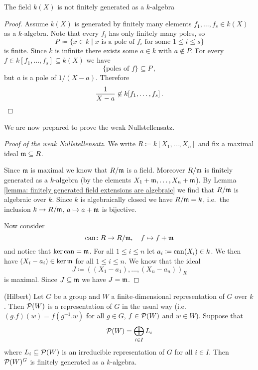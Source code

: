 \begin{rem}
  The field $k(X)$ is not finitely generated as a $k$-algebra
  \begin{proof}
    Assume $k(X)$ is generated by finitely many elements $f_1, \dotsc, f_s \in k(X)$ as a $k$-algebra. Note that every $f_i$ has only finitely many poles, so
    \[
      P \coloneqq \{x \in k \mid \text{$x$ is a pole of $f_i$ for some $1 \leq i \leq s$}\}
    \]
    is finite. Since $k$ is infinite there exists some $a \in k$ with $a \not\in P$. For every $f \in k[f_1, \dotsc, f_s] \subseteq k(X)$ we have
    \[
      \{\text{poles of $f$}\} \subseteq P \,,
    \]
      but $a$ is a pole of $1/(X-a)$. Therefore
    \[
      \frac{1}{X-a} \not\in k[f_1, \dotsc, f_s] \,.
      \qedhere
    \]
  \end{proof}
\end{rem}


We are now prepared to prove the weak Nullstellensatz.


\begin{proof}[Proof of the weak Nullstellensatz]
  We write $R \coloneqq k[X_1, \dotsc, X_n]$ and fix a maximal ideal $\mathfrak{m} \subseteq R$.
  
  Since $\mathfrak{m}$ is maximal we know that $R / \mathfrak{m}$ is a field.
  Moreover $R / \mathfrak{m}$ is finitely generated as a $k$-algebra (by the elements $X_1 + \mathfrak{m}, \dotsc, X_n + \mathfrak{m}$).
  By Lemma \ref{lemma: finitely generated field extensions are algebraic} we find that $R/\mathfrak{m}$ is algebraic over $k$.
  Since $k$ is algebraically closed we have $R / \mathfrak{m} = k$, i.e.\ the inclusion $k \to R / \mathfrak{m}$, $a \mapsto a + \mathfrak{m}$ is bijective.
  
  Now consider
  \[
            \operatorname{can}
    \colon  R \to R / \mathfrak{m},
    \quad   f
    \mapsto f + \mathfrak{m}
  \]
  and notice that $\ker \operatorname{can} = \mathfrak{m}$.
  For all $1 \leq i \leq n$ let $a_i \coloneqq \operatorname{can}(X_i) \in k$.
  We then have $(X_i - a_i) \in \ker \mathfrak{m}$ for all $1 \leq i \leq n$.
  We know that the ideal
  \[
              J
    \coloneqq ( (X_1 - a_1), \dotsc, (X_n - a_n) )_R
  \]
  is maximal.
  Since $J \subseteq \mathfrak{m}$ we have $J = \mathfrak{m}$.
\end{proof}


\begin{theorem}(Hilbert)
  Let $G$ be a group and $W$ a finite-dimensional representation of $G$ over $k$.
  Then $\mathcal{P}(W)$ is a representation of $G$ in the usual way (i.e.\ $(g.f)(w) = f\left( g^{-1}.w \right)$ for all $g \in G$, $f \in \mathcal{P}(W)$ and $w \in W$).
  Suppose that
  \[
      \mathcal{P}(W)
    = \bigoplus_{i \in I} L_i
  \]
  where $L_i \subseteq \mathcal{P}(W)$ is an irreducible representation of $G$ for all $i \in I$.
  Then $\mathcal{P}(W)^G$ is finitely generated as a $k$-algebra.
\end{theorem}


